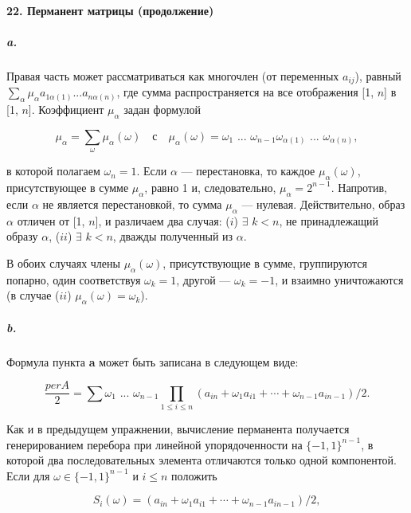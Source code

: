 \documentclass{../../template/mai_book}
\begin{document}
\paragraph{22. Перманент матрицы (продолжение)}

\subparagraph{a.} Правая часть может рассматриваться как многочлен (от переменных $a_{ij}$), равный ${\sum}_\alpha \mu_\alpha a_{1 \alpha(1)} ... a_{n \alpha(n)}$, где сумма распространяется на все отображения [1, $n$] в [1, $n$]. Коэффициент $\mu_\alpha$ задан формулой

\begin{equation*}
\mu_\alpha = \sum_\omega \mu_\alpha(\omega) \quad \text{с} \quad \mu_\alpha(\omega) = \omega_1 \text{ ... } \omega_{n - 1} \omega_{\alpha(1)} \text{ ... } \omega_{\alpha(n)},
\end{equation*}

\noindent
в которой полагаем $\omega_n = 1$. Если $\alpha$ — перестановка, то каждое $\mu_\alpha(\omega)$, присутствующее в сумме $\mu_\alpha$, равно 1 и, следовательно, $\mu_\alpha = 2^{n - 1}$. Напротив, если $\alpha$ не является перестановкой, то сумма $\mu_\alpha$ — нулевая. Действительно, образ $\alpha$ отличен от [1, $n$], и различаем два случая: \newline
\indent ($i$) $\exists$ $k < n$, не принадлежащий образу $\alpha$, \newline
\indent ($ii$) $\exists$ $k < n$, дважды полученный из $\alpha$.

В обоих случаях члены $\mu_\alpha(\omega)$, присутствующие в сумме, группируются попарно, один соответствуя $\omega_k = 1$, другой — $\omega_k = -1$, и взаимно уничтожаются (в случае ($ii$) $\mu_\alpha(\omega) = \omega_k$).

\subparagraph{b.} Формула пункта \textbf{a} может быть записана в следующем виде:

\begin{equation*}
\frac{per A}{2} = \sum \omega_1 \text{ ... } \omega_{n - 1} \prod_{1 \leq i \leq n} (a_{in} + \omega_1 a_{i1} + \cdots + \omega_{n - 1} a_{in - 1})/2.
\end{equation*}

\noindent
Как и в предыдущем упражнении, вычисление перманента получается генерированием перебора при линейной упорядоченности на $\{-1, 1\}^{n - 1}$, в которой два последовательных элемента отличаются только одной компонентой. Если для $\omega \in \{-1, 1\}^{n - 1}$ и $i \leq n$ положить

\begin{equation*}
S_i(\omega) = (a_{in} + \omega_1 a_{i1} + \cdots + \omega_{n - 1} a_{in - 1})/2,
\end{equation*}
\end{document}
